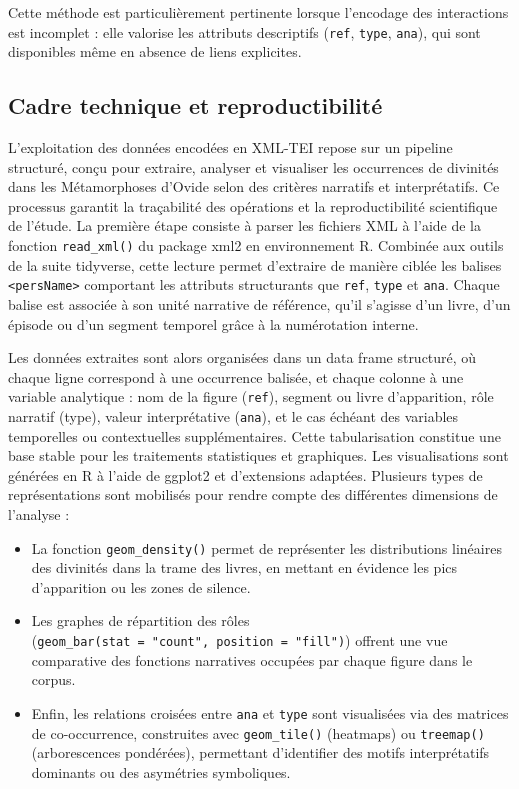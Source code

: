 \documentclass[
  letterpaper,
  DIV=11,
  numbers=noendperiod]{scrreprt}
\begin{document}
Cette méthode est particulièrement pertinente lorsque l'encodage des
interactions est incomplet : elle valorise les attributs descriptifs
(\texttt{ref}, \texttt{type}, \texttt{ana}), qui sont disponibles même
en absence de liens explicites.

\subsection{Cadre technique et
reproductibilité}\label{cadre-technique-et-reproductibilituxe9}

L'exploitation des données encodées en XML-TEI repose sur un pipeline
structuré, conçu pour extraire, analyser et visualiser les occurrences
de divinités dans les Métamorphoses d'Ovide selon des critères narratifs
et interprétatifs. Ce processus garantit la traçabilité des opérations
et la reproductibilité scientifique de l'étude. La première étape
consiste à parser les fichiers XML à l'aide de la fonction
\texttt{read\_xml()} du package xml2 en environnement R. Combinée aux
outils de la suite tidyverse, cette lecture permet d'extraire de manière
ciblée les balises \texttt{\textless{}persName\textgreater{}} comportant
les attributs structurants que \texttt{ref}, \texttt{type} et
\texttt{ana}. Chaque balise est associée à son unité narrative de
référence, qu'il s'agisse d'un livre, d'un épisode ou d'un segment
temporel grâce à la numérotation interne.

Les données extraites sont alors organisées dans un data frame
structuré, où chaque ligne correspond à une occurrence balisée, et
chaque colonne à une variable analytique : nom de la figure
(\texttt{ref}), segment ou livre d'apparition, rôle narratif (type),
valeur interprétative (\texttt{ana}), et le cas échéant des variables
temporelles ou contextuelles supplémentaires. Cette tabularisation
constitue une base stable pour les traitements statistiques et
graphiques. Les visualisations sont générées en R à l'aide de ggplot2 et
d'extensions adaptées. Plusieurs types de représentations sont mobilisés
pour rendre compte des différentes dimensions de l'analyse :

\begin{itemize}
\item
  La fonction \texttt{geom\_density()} permet de représenter les
  distributions linéaires des divinités dans la trame des livres, en
  mettant en évidence les pics d'apparition ou les zones de silence.
\item
  Les graphes de répartition des rôles
  (\texttt{geom\_bar(stat\ =\ "count",\ position\ =\ "fill")}) offrent
  une vue comparative des fonctions narratives occupées par chaque
  figure dans le corpus.
\item
  Enfin, les relations croisées entre \texttt{ana} et \texttt{type} sont
  visualisées via des matrices de co-occurrence, construites avec
  \texttt{geom\_tile()} (heatmaps) ou \texttt{treemap()} (arborescences
  pondérées), permettant d'identifier des motifs interprétatifs
  dominants ou des asymétries symboliques.
\end{itemize}
\end{document}
